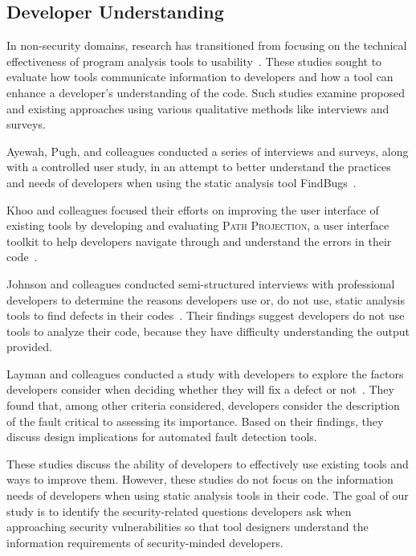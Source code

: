 \documentclass[conference]{IEEEtran}
\begin{document}
\subsection{Developer Understanding}
\label{understanding}
In non-security domains, research has transitioned from focusing on the technical effectiveness of program analysis tools to usability~\cite{johnson2013don, ayewah2008using, khoo2008path}. 
These studies sought to evaluate how tools communicate information to developers and how a tool can enhance a developer's understanding of the code. 
Such studies examine proposed and existing approaches using various qualitative methods like interviews and surveys. 

Ayewah, Pugh, and colleagues conducted a series of interviews and surveys, along with a controlled user study, in an attempt to better understand the practices and needs of developers when using the static analysis tool FindBugs~\cite{ayewah2008report, ayewah2008using}.

Khoo and colleagues focused their efforts on improving the user interface of existing tools by developing and evaluating \textsc{Path Projection}, a user interface toolkit to help developers navigate through and understand the errors in their code~\cite{khoo2008path}.

Johnson and colleagues conducted semi-structured interviews with professional developers to determine the reasons developers use or, do not use, static analysis tools to find defects in their codes~\cite{johnson2013don}. 
Their findings suggest developers do not use tools to analyze their code, because they have difficulty understanding the output provided. 

Layman and colleagues conducted a study with developers to explore the factors developers consider when deciding whether they will fix a defect or not~\cite{layman2007toward}. 
They found that, among other criteria considered, developers consider the description of the fault critical to assessing its importance. 
Based on their findings, they discuss design implications for automated fault detection tools.

These studies discuss the ability of developers to effectively use existing tools and ways to improve them. However, these studies do not focus on the information needs of developers when using static analysis tools in their code. 
The goal of our study is to identify the security-related questions developers ask when approaching security vulnerabilities so that tool designers understand the information requirements of security-minded developers.
\end{document}
